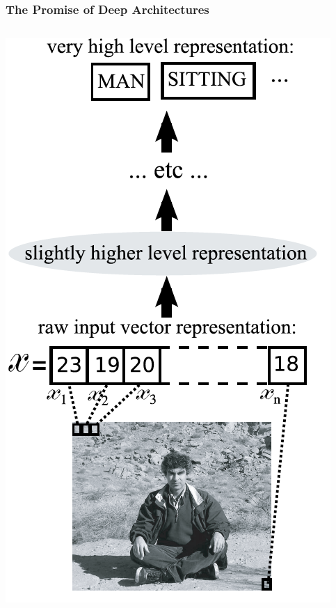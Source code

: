 \documentclass{beamer}
\begin{document}
\begin{frame}
\frametitle{The Promise of Deep Architectures}
\begin{columns}
\begin{column}{0.5\textwidth}
\centerline{\includegraphics[scale=0.3]{figs/bengio_sitting}}
\end{column}
\begin{column}{0.5\textwidth}
\begin{center}
\begin{tikzpicture}[-,>=stealth',shorten >=1pt,auto,node distance=3cm,
  thick,main node/.style={circle,fill=blue!20,draw,font=\sffamily\Large\bfseries}]


\end{tikzpicture}
\end{center}
\end{column}
\end{columns}
\end{frame}
\end{document}
